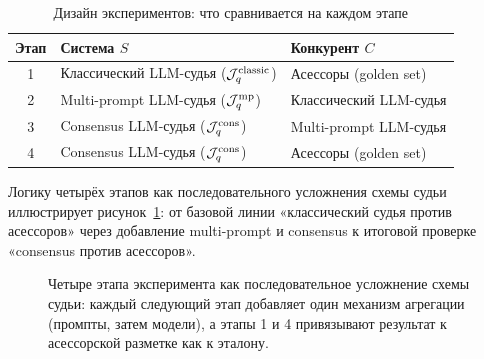 \begin{table}[htbp]
    \centering
    \caption{Дизайн экспериментов: что сравнивается на каждом этапе}
    \label{tab:experiments-design}
    \begin{tabular}{cll}
        \toprule
        Этап & Система $S$ & Конкурент $C$ \\
        \midrule
        1 & Классический LLM-судья
            ($\mathcal{J}_q^{\mathrm{classic}}$) &
            Асессоры (golden set) \\
        2 & Multi-prompt LLM-судья
            ($\mathcal{J}_q^{\mathrm{mp}}$) &
            Классический LLM-судья \\
        3 & Consensus LLM-судья
            ($\mathcal{J}_q^{\mathrm{cons}}$) &
            Multi-prompt LLM-судья \\
        4 & Consensus LLM-судья
            ($\mathcal{J}_q^{\mathrm{cons}}$) &
            Асессоры (golden set) \\
        \bottomrule
    \end{tabular}
\end{table}

Логику четырёх этапов как последовательного усложнения схемы судьи
иллюстрирует рисунок~\ref{fig:stages-flow}: от базовой линии
«классический судья против асессоров» через добавление multi-prompt и
consensus к итоговой проверке «consensus против асессоров».

\begin{figure}[htbp]
    \centering
    \caption{Четыре этапа эксперимента как последовательное усложнение
    схемы судьи: каждый следующий этап добавляет один механизм агрегации
    (промпты, затем модели), а этапы 1 и 4 привязывают результат к
    асессорской разметке как к эталону.}
    \label{fig:stages-flow}
\end{figure}

